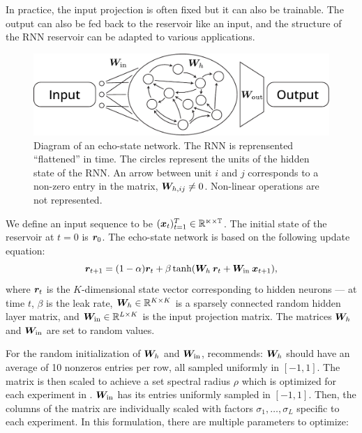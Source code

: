 In practice, the input projection is often fixed but it can also be trainable.
The output can also be fed back to the reservoir like an input, and the
structure of the \ac{RNN} reservoir can be adapted to various applications.

\begin{figure}[htbp]
  \centering
  \includegraphics[width=.8\linewidth]{figures/echo_state_network}
  \caption{Diagram of an echo-state network. The \ac{RNN} is reprensented
    ``flattened'' in time. The circles represent the units of the hidden state
    of the \ac{RNN}. An arrow between unit $i$ and $j$ corresponds to a non-zero
    entry in the matrix, ${\bm{W}}_{h, ij} \neq 0$. Non-linear operations are not
    represented.}
  \label{fig:echo_state_network}
\end{figure}

We define an input sequence to be $({\bm{x}}_{t})_{t=1}^{T} \in \mathbb{R^{n\times T}}$. The
initial state of the reservoir at $t = 0$ is ${\bm{r}}_{0}$. The echo-state network
is based on the following update equation:
\begin{equation}
  \label{eq:esn}
  {\bm{r}}_{t + 1} = (1 - \alpha) {\bm{r}}_{t}
  +
  \beta \tanh({\bm{W}}_{h}\: {\bm{r}}_{t} + {\bm{W}}_{\text{in}}\: {\bm{x}}_{t + 1}),
\end{equation}
where ${\bm{r}}_{t}$ is the $K$-dimensional state vector corresponding to
hidden neurons --- at time $t$, $\beta$ is the leak rate,
${\bm{W}}_{h} \in \mathbb{R}^{K \times K}$ is a sparsely connected random hidden
layer matrix, and ${\bm{W}}_{\text{in}} \in \mathbb{R}^{L \times K}$ is the input
projection matrix. The matrices ${\bm{W}}_{h}$ and ${\bm{W}}_{\text{in}}$ are set to
random values.

For the random initialization of ${\bm{W}}_{h}$ and ${\bm{W}}_{\text{in}}$,
\textcite{jaegerLongShortTermMemory2012} recommends: ${\bm{W}}_{h}$ should have an
average of 10 nonzeros entries per row, all sampled uniformly in $[-1, 1]$. The
matrix is then scaled to achieve a set spectral radius $\rho$ which is optimized
for each experiment in \parencite{jaegerLongShortTermMemory2012}.
${\bm{W}}_{\text{in}}$ has its entries uniformly sampled in $[-1, 1]$. Then, the
columns of the matrix are individually scaled with factors $\sigma_{1}, \ldots, \sigma_{L}$
specific to each experiment. In this formulation, there are multiple parameters
to optimize:

